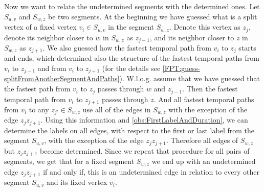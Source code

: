 \documentclass[11pt,a4paper]{article}
\theoremstyle{remark}
\theoremstyle{definition}
\begin{document}
Now we want to relate the undetermined segments with the determined ones.
Let $S_{u,v}$ and $S_{w,z}$ be two segments.
At the beginning we have guessed what is a split vertex of a fixed vertex $v_i \in S_{u,v}$ in the segment  $S_{w,z}$. 
Denote this vertex as $z_j$, denote its neighbor closer to $w$ in $S_{w,z}$ as $z_{j-1}$,
and its neighbor closer to $z$ in $S_{w,z}$ as $z_{j+1}$.
We also guessed how the fastest temporal path from $v_i$ to $z_j$ starts and ends, which determined also the structure of the fastest temporal paths 
from $v_i$ to $z_{j-1}$ and from $v_i$ to $z_{j+1}$
(for the details see \cref{FPT:guess-splitFromAnotherSegmentAndPaths}).
W.l.o.g. assume that we have guessed that the fastest path from $v_i$ to $z_j$
passes through $w$ and $z_{j-1}$.
Then the fastest temporal path from $v_i$ to $z_{j+1}$ passes through $z$.
And all fastest temporal paths from $v_i$ to any $z_{j'} \in S_{w,z}$
use all of the edges in $S_{w,z}$ with the exception of the edge $z_j z_{j+1}$.
Using this information and \cref{obs:FirstLabelAndDuration}, we can determine the labels on all edges, with respect to the first or last label from the segment $S_{u,v}$,
with the exception of the edge $z_j z_{j+1}$.
Therefore all edges of $S_{w,z}$ but $z_j z_{j+1}$ become determined.
Since we repeat that procedure for all pairs of segments,
we get that for a fixed segment $S_{w,z}$ we end up with an undetermined edge $z_j z_{j+1}$
if and only if, this is an undetermined edge in relation to every other segment $S_{u,v}$ and its fixed vertex $v_i$.
\end{document}
